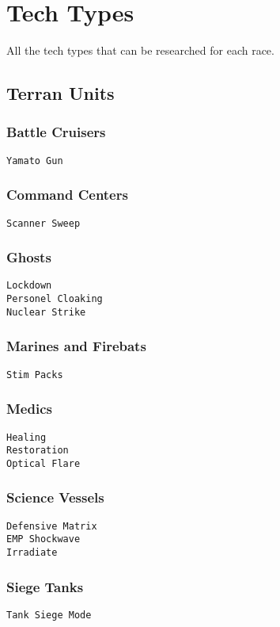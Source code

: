 \chapter{Tech Types}
\label{techtype}
All the tech types that can be researched for each race.

\section{Terran Units}

\subsection{Battle Cruisers}
\verb|Yamato Gun|

\subsection{Command Centers}
\verb|Scanner Sweep| 

\subsection{Ghosts}
\verb|Lockdown| \\
\verb|Personel Cloaking| \\
\verb|Nuclear Strike|

\subsection{Marines and Firebats}
\verb|Stim Packs|

\subsection{Medics}
\verb|Healing| \\
\verb|Restoration| \\
\verb|Optical Flare|

\subsection{Science Vessels}
\verb|Defensive Matrix| \\
\verb|EMP Shockwave| \\
\verb|Irradiate| 

\subsection{Siege Tanks}
\verb|Tank Siege Mode| 

